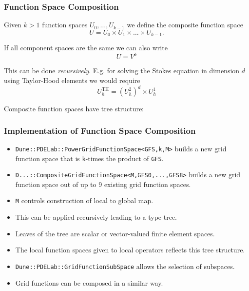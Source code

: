 \begin{frame}
\frametitle{Function Space Composition}
Given $k>1$ function spaces $U_0, \ldots, U_{k-1}$ we define the
composite function space 
\begin{equation*}
U = U_0 \times U_1 \times \ldots \times U_{k-1} .
\end{equation*}

If all component spaces are the same we can also write
\begin{equation*}
U = V^k
\end{equation*}

This can be done \textit{recursively}. E.g. for solving the Stokes equation
in dimension $d$ using Taylor-Hood elements we would require
\begin{equation*}
U_h^\text{TH} = \left( U_h^2\right)^d \times U_h^1
\end{equation*}

Composite function spaces have tree structure:
\begin{minipage}[c]{0.2\textwidth}
\end{minipage}
\end{frame}

\begin{frame}
\frametitle<presentation>{Implementation of Function Space Composition}
\begin{itemize}
\item \lstinline{Dune::PDELab::PowerGridFunctionSpace<GFS,k,M>} builds a
new grid function space that is \lstinline{k}-times the product of \lstinline{GFS}.
\item \lstinline{D...::CompositeGridFunctionSpace<M,GFS0,...,GFS8>}
builds a new grid function space out of up to 9 existing grid function
spaces. 
\item \lstinline{M} controls construction of local to global map.
\item This can be applied recursively leading to a type tree.
\item Leaves of the tree are scalar or vector-valued finite element spaces.
\item The local function spaces given to local operators reflects this tree structure.
\item \lstinline{Dune::PDELab::GridFunctionSubSpace} allows the selection of subspaces.
\item Grid functions can be composed in a similar way.
\end{itemize}
\end{frame}

